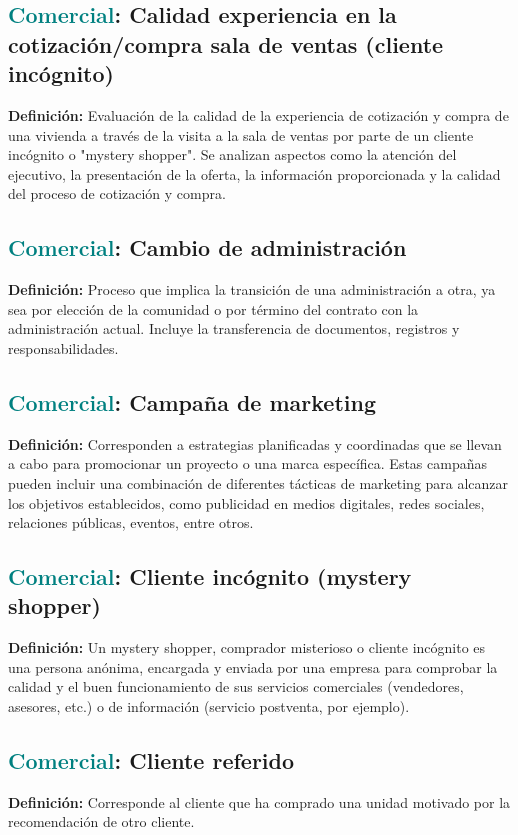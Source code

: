 \documentclass[12pt]{article}
\begin{document}
\subsection{\textcolor{teal}{Comercial}: Calidad experiencia en la cotización/compra sala de ventas (cliente incógnito)}
\textbf{Definición:} Evaluación de la calidad de la experiencia de cotización y compra de una vivienda a través de la visita a la sala de ventas por parte de un cliente incógnito o "mystery shopper". Se analizan aspectos como la atención del ejecutivo, la presentación de la oferta, la información proporcionada y la calidad del proceso de cotización y compra.
\subsection{\textcolor{teal}{Comercial}: Cambio de administración}
\textbf{Definición:} Proceso que implica la transición de una administración a otra, ya sea por elección de la comunidad o por término del contrato con la administración actual. Incluye la transferencia de documentos, registros y responsabilidades.
\subsection{\textcolor{teal}{Comercial}: Campaña de marketing}
\textbf{Definición:} Corresponden a estrategias planificadas y coordinadas que se llevan a cabo para promocionar un proyecto o una marca específica. Estas campañas pueden incluir una combinación de diferentes tácticas de marketing para alcanzar los objetivos establecidos, como publicidad en medios digitales, redes sociales, relaciones públicas, eventos, entre otros.
\subsection{\textcolor{teal}{Comercial}: Cliente incógnito (mystery shopper)}
\textbf{Definición:} Un mystery shopper, comprador misterioso o cliente incógnito es una persona anónima, encargada y enviada por una empresa para comprobar la calidad y el buen funcionamiento de sus servicios comerciales (vendedores, asesores, etc.) o de información (servicio postventa, por ejemplo).
\subsection{\textcolor{teal}{Comercial}: Cliente referido}
\textbf{Definición:} Corresponde al cliente que ha comprado una unidad motivado por la recomendación de otro cliente.
\end{document}
